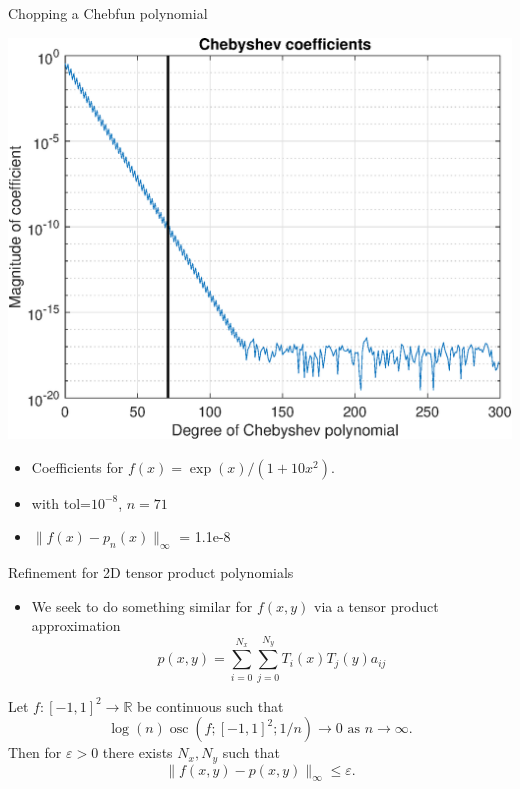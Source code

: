 \documentclass{beamer}
\newcommand{\R}{\mathbb{R}}
\DeclareMathOperator*{\osc}{osc}
\begin{document}
\begin{frame}{Chopping a Chebfun polynomial}
\begin{center}
\includegraphics[scale = 0.4]{Cheb8.eps}
\end{center}

\begin{center}
\begin{itemize}
\item \begin{center} Coefficients for $f(x)=\exp(x)/(1+10 x^2)$. \end{center}
\item \begin{center} with tol=$10^{-8}$, $n=71$ \end{center}
\item \begin{center} $\| f(x)-p_n(x) \|_{\infty}$ = 1.1e-8 \end{center}
\end{itemize}
\end{center}
\end{frame}

\begin{frame}{Refinement for 2D tensor product polynomials}
\begin{itemize}
\item We seek to do something similar for $f(x,y)$ via a tensor product approximation $$ p(x,y) = \sum_{i=0}^{N_x} \sum_{j=0}^{N_y} T_i(x)T_j(y) a_{ij}$$
\end{itemize}

\begin{theorem} 
Let $f:[-1,1]^2 \to \R$ be continuous such that
$$
\log(n)\osc(f;[-1,1]^2;1/n)\to 0 \text{ as } n\to \infty.
$$
Then for $\varepsilon>0$ there exists $N_x,N_y$ such that
$$
\|f(x,y)-p(x,y)\|_{\infty} \leq \varepsilon.
$$
 \end{theorem}

\end{frame}
\end{document}
